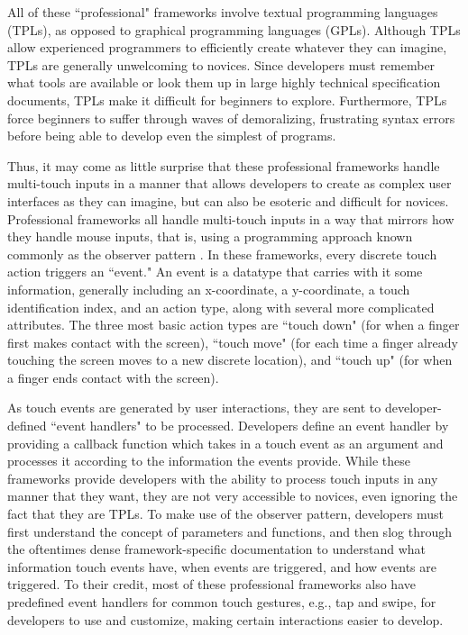 All of these ``professional" frameworks involve textual programming languages (TPLs), as opposed to graphical programming languages (GPLs). Although TPLs allow experienced programmers to efficiently create whatever they can imagine, TPLs are generally unwelcoming to novices. Since developers must remember what tools are available or look them up in large highly technical specification documents, TPLs make it difficult for beginners to explore. Furthermore, TPLs  force beginners to suffer through waves of demoralizing, frustrating syntax errors before being able to develop even the simplest of programs.

Thus, it may come as little surprise that these professional frameworks handle multi-touch inputs in a manner that allows developers to create as complex user interfaces as they can imagine, but can also be esoteric and difficult for novices. Professional frameworks all handle multi-touch inputs in a way that mirrors how they handle mouse inputs, that is, using a programming approach known commonly as the observer pattern \cite{Gamma}. In these frameworks, every discrete touch action triggers an ``event." An event is a datatype that carries with it some information, generally including an x-coordinate, a y-coordinate, a touch identification index, and an action type, along with several more complicated attributes. The three most basic action types are ``touch down" (for when a finger first makes contact with the screen), ``touch move" (for each time a finger already touching the screen moves to a new discrete location), and ``touch up" (for when a finger ends contact with the screen).

As touch events are generated by user interactions, they are sent to developer-defined ``event handlers" to be processed. Developers define an event handler by providing a callback function which takes in a touch event as an argument and processes it according to the information the events provide. While these frameworks provide developers with the ability to process touch inputs in any manner that they want, they are not very accessible to novices, even ignoring the fact that they are TPLs. To make use of the observer pattern, developers must first understand the concept of parameters and functions, and then slog through the oftentimes dense framework-specific documentation to understand what information touch events have, when events are triggered, and how events are triggered. To their credit, most of these professional frameworks also have predefined event handlers for common touch gestures, e.g., tap and swipe, for developers to use and customize, making certain interactions easier to develop.


